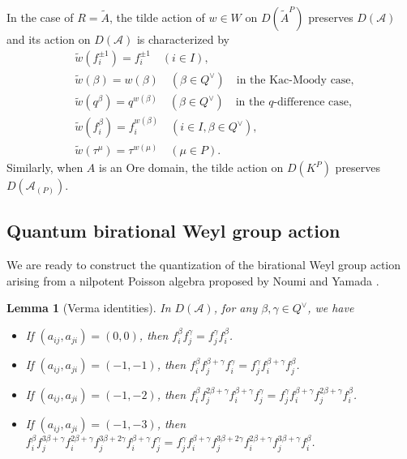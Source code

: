 \documentclass[12pt,twoside]{article}
\newcommand\A{{\mathcal A}}
\newcommand\Qv{Q^\vee}
\newcommand\tw{{\widetilde w}}
\newcommand\tA{{\widetilde A}}
\theoremstyle{plain} %
\newtheorem{lemma}[theorem]{Lemma}
\theoremstyle{definition} %
\theoremstyle{definition} %
\numberwithin{theorem}{section}
\numberwithin{equation}{section}
\numberwithin{figure}{section}
\numberwithin{table}{section}
\begin{document}
In the case of $R=\tA$, 
the tilde action of $w\in W$ on $D(\tA^P)$ preserves $D(\A)$
and its action on $D(\A)$ is characterized by
\begin{align*}
 &
 \tw(f_i^{\pm1})=f_i^{\pm1} \quad (i\in I),
 \\ &
 \tw(\beta)=w(\beta) \quad (\beta\in\Qv)
 \quad\text{in the Kac-Moody case},
 \\ &
 \tw(q^\beta)=q^{w(\beta)} \quad (\beta\in\Qv)
 \quad\text{in the $q$-difference case},
 \\&
 \tw(f_i^\beta)=f_i^{w(\beta)} \quad (i\in I, \beta\in\Qv),
 \\&
 \tw(\tau^\mu)=\tau^{w(\mu)} \quad (\mu\in P).
\end{align*}
Similarly, when $A$ is an Ore domain, the tilde action on $D(K^P)$
preserves $D(\A_{(P)})$.


\subsection{Quantum birational Weyl group action}
\label{sec:birat}

We are ready to construct the quantization of 
the birational Weyl group action arising from a nilpotent
Poisson algebra proposed by Noumi and Yamada \cite{NY0012028}.

\begin{lemma}[Verma identities]
\label{lemma:Verma}
 In $D(\A)$, for any $\beta,\gamma\in\Qv$, we have
 \begin{itemize}

  \item If $(a_{ij},a_{ji})=(0,0)$, then \(
   f_i^{\beta} f_j^{\gamma} = f_j^{\gamma} f_i^{\beta}
  \).

  \item If $(a_{ij},a_{ji})=(-1,-1)$, then \(
   f_i^{\beta} f_j^{\beta+\gamma} f_i^{\gamma} =
   f_j^{\gamma} f_i^{\beta+\gamma} f_j^{\beta}
  \).

  \item If $(a_{ij},a_{ji})=(-1,-2)$, then \(
   f_i^{\beta} f_j^{2\beta+\gamma} f_i^{\beta+\gamma} f_j^{\gamma} =
   f_j^{\gamma} f_i^{\beta+\gamma} f_j^{2\beta+\gamma} f_i^{\beta}
  \).

  \item If $(a_{ij},a_{ji})=(-1,-3)$, then \\
  \hphantom{\qquad} 
  \(
   f_i^{\beta} f_j^{3\beta+\gamma} f_i^{2\beta+\gamma} 
   f_j^{3\beta+2\gamma} f_i^{\beta+\gamma} f_j^{\gamma} =
   f_j^{\gamma} f_i^{\beta+\gamma} f_j^{3\beta+2\gamma} 
   f_i^{2\beta+\gamma} f_j^{3\beta+\gamma} f_i^{\beta}
  \).
 \end{itemize}
\end{lemma}
\end{document}
